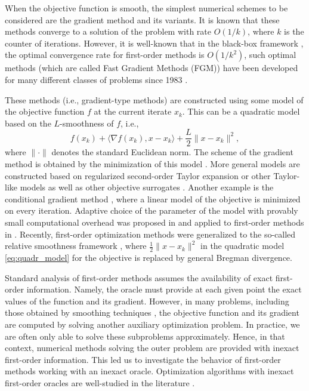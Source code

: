 \documentclass[11pt]{amsart}
\theoremstyle{definition}
\numberwithin{equation}{section}
\begin{document}
When the objective function is smooth, the simplest numerical schemes to be considered are the gradient method and its variants. It is known that these methods converge to a solution of the problem with rate $O(1/k)$, where $k$ is the counter of iterations.  However, it is well-known that in the black-box framework \cite{Nemirovskii1983Complexity}, the optimal convergence rate for first-order methods is $O(1/k^2)$,  such optimal methods (which are called Fast Gradient Methods (FGM)) have been developed for many different classes of problems since 1983 \cite{Nesterov1983,Nesterov_book,Nesterov1988approach}. 

These methods (i.e., gradient-type methods) are constructed using some model of the objective function $f$ at the current iterate $x_k$. This can be a quadratic model based on the $L$-smoothness of $f$, i.e.,
\begin{equation}\label{eq:quadr_model}
    f(x_k) + \langle \nabla f(x_k), x-x_k \rangle + \frac{L}{2}\|x-x_k\|^2,
\end{equation}
where $\|\cdot\|$ denotes the standard Euclidean norm.
The scheme of the gradient method is obtained by the minimization of this model \cite{Nesterov_book}.  More general models are constructed based on regularized second-order Taylor expansion \cite{nesterov2006cubic} or other Taylor-like models \cite{drusvyatskiy2019nonsmooth} as well as other objective surrogates \cite{mairal2013optimization}. Another example is the conditional gradient method \cite{frank1956algorithm}, where a linear model of the objective is minimized on every iteration. Adaptive choice of the parameter of the model with provably small computational overhead was proposed in \cite{nesterov2006cubic} and applied to first-order methods in \cite{Nesterov2015Universal,nesterov2013gradient}. Recently, first-order optimization methods were generalized to the so-called relative smoothness framework \cite{bauschke2016descent,lu2018relatively,ochs2017non}, where $\frac{1}{2} \|x-x_k\|^2$ in the quadratic model \eqref{eq:quadr_model} for the objective is replaced by general Bregman divergence.

Standard analysis of first-order methods assumes the availability of exact first-order information. Namely, the oracle must provide at each given point the exact values of the function and its gradient. However, in many problems, including those obtained by smoothing techniques \cite{Nesterov2005Smooth}, the objective function and its gradient are computed by solving another auxiliary optimization problem. In practice, we are often only able to solve these subproblems approximately. Hence, in that context, numerical methods solving the outer problem are provided with inexact first-order information. This led us to investigate the behavior of first-order methods working with an inexact oracle. Optimization algorithms with inexact first-order oracles are well-studied in the literature \cite{Cohen2018Acceleration,Devolder2013smooth,Devolder2013strongly,Devolder2013disser,Dvurechensky2016Stochastic,Dvurechensky2022gradient,Aspremont2008Smooth}.
\end{document}
